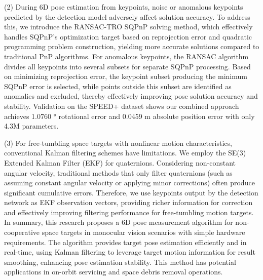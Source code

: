 (2) During 6D pose estimation from keypoints, noise or anomalous keypoints predicted by the detection model adversely affect solution accuracy. To address this, we introduce the RANSAC-TRO SQPnP solving method, which effectively handles SQPnP's optimization target based on reprojection error and quadratic programming problem construction, yielding more accurate solutions compared to traditional PnP algorithms. For anomalous keypoints, the RANSAC algorithm divides all keypoints into several subsets for separate SQPnP processing. Based on minimizing reprojection error, the keypoint subset producing the minimum SQPnP error is selected, while points outside this subset are identified as anomalies and excluded, thereby effectively improving pose solution accuracy and stability. Validation on the SPEED+ dataset shows our combined approach achieves 1.0760 ° rotational error and 0.0459 m absolute position error with only 4.3M parameters.

(3) For free-tumbling space targets with nonlinear motion characteristics, conventional Kalman filtering schemes have limitations. We employ the SE(3) Extended Kalman Filter (EKF) for quaternions. Considering non-constant angular velocity, traditional methods that only filter quaternions (such as assuming constant angular velocity or applying minor corrections) often produce significant cumulative errors. Therefore, we use keypoints output by the detection network as EKF observation vectors, providing richer information for correction and effectively improving filtering performance for free-tumbling motion targets.
In summary, this research proposes a 6D pose measurement algorithm for non-cooperative space targets in monocular vision scenarios with simple hardware requirements. The algorithm provides target pose estimation efficiently and in real-time, using Kalman filtering to leverage target motion information for result smoothing, enhancing pose estimation stability. This method has potential applications in on-orbit servicing and space debris removal operations.

